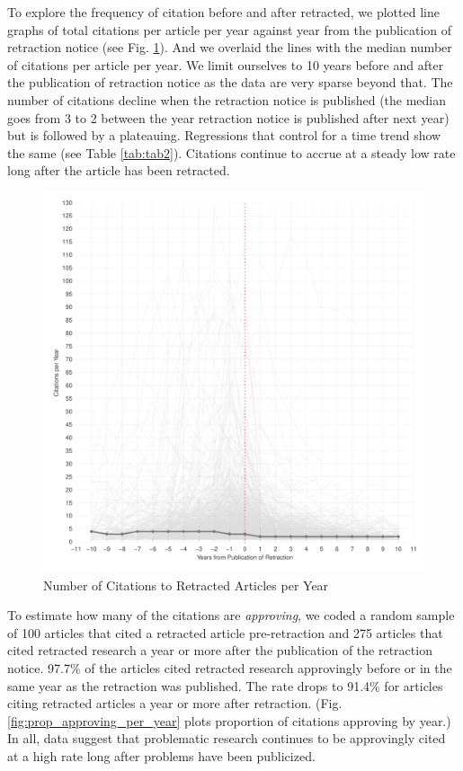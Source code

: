 \documentclass[12pt]{article}
\begin{document}
To explore the frequency of citation before and after retracted, we plotted line graphs of total citations per article per year against year from the publication of retraction notice (see Fig. \ref{fig:pre_post_retraction}). And we overlaid the lines with the median number of citations per article per year. We limit ourselves to 10 years before and after the publication of retraction notice as the data are very sparse beyond that. The number of citations decline when the retraction notice is published (the median goes from 3 to 2 between the year retraction notice is published after next year) but is followed by a plateauing. Regressions that control for a time trend show the same (see Table \ref{tab:tab2}). Citations continue to accrue at a steady low rate long after the article has been retracted.

\begin{figure}[h]
\centering
\includegraphics[scale=.7]{../figs/retracted_growth_curve.pdf}
\caption{Number of Citations to Retracted Articles per Year}
\label{fig:pre_post_retraction}
\end{figure}

To estimate how many of the citations are \textit{approving}, we coded a random sample of 100 articles that cited a retracted article pre-retraction and 275 articles that cited retracted research a year or more after the publication of the retraction notice. 97.7\% of the articles cited retracted research approvingly before or in the same year as the retraction was published. The rate drops to 91.4\% for articles citing retracted articles a year or more after retraction. (Fig. \ref{fig:prop_approving_per_year} plots proportion of citations approving by year.) In all, data suggest that problematic research continues to be approvingly cited at a high rate long after problems have been publicized.
\end{document}
